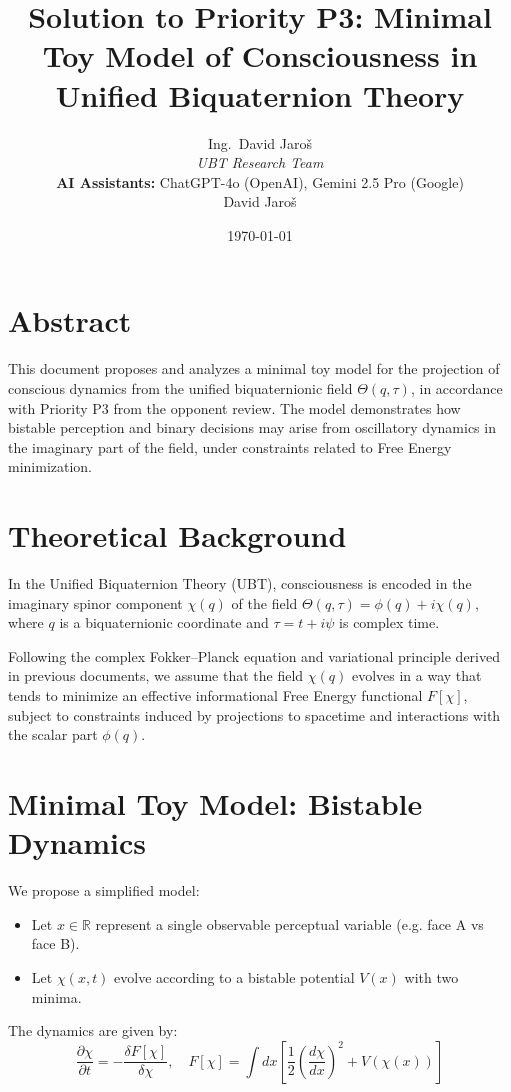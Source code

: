 \documentclass[12pt]{article}
\title{Solution to Priority P3: Minimal Toy Model of Consciousness in Unified Biquaternion Theory}
\author{
Ing.~David Jaroš \\
\textit{UBT Research Team} \\
\textbf{AI Assistants:} ChatGPT-4o (OpenAI), Gemini 2.5 Pro (Google) \\
David Jaroš}
\date{\today}
\begin{document}
\maketitle

\section*{Abstract}
This document proposes and analyzes a minimal toy model for the projection of conscious dynamics from the unified biquaternionic field \(\Theta(q, \tau)\), in accordance with Priority P3 from the opponent review. The model demonstrates how bistable perception and binary decisions may arise from oscillatory dynamics in the imaginary part of the field, under constraints related to Free Energy minimization.

\section{Theoretical Background}
In the Unified Biquaternion Theory (UBT), consciousness is encoded in the imaginary spinor component \(\chi(q)\) of the field \(\Theta(q, \tau) = \phi(q) + i \chi(q)\), where \(q\) is a biquaternionic coordinate and \(\tau = t + i \psi\) is complex time.

Following the complex Fokker–Planck equation and variational principle derived in previous documents, we assume that the field \(\chi(q)\) evolves in a way that tends to minimize an effective informational Free Energy functional \(F[\chi]\), subject to constraints induced by projections to spacetime and interactions with the scalar part \(\phi(q)\).

\section{Minimal Toy Model: Bistable Dynamics}
We propose a simplified model:
\begin{itemize}
    \item Let \(x \in \mathbb{R}\) represent a single observable perceptual variable (e.g. face A vs face B).
    \item Let \(\chi(x,t)\) evolve according to a bistable potential \(V(x)\) with two minima.
\end{itemize}

The dynamics are given by:
\[
\frac{\partial \chi}{\partial t} = -\frac{\delta F[\chi]}{\delta \chi}, \quad
F[\chi] = \int dx \left[ \frac{1}{2} \left( \frac{d\chi}{dx} \right)^2 + V(\chi(x)) \right]
\]
\end{document}
